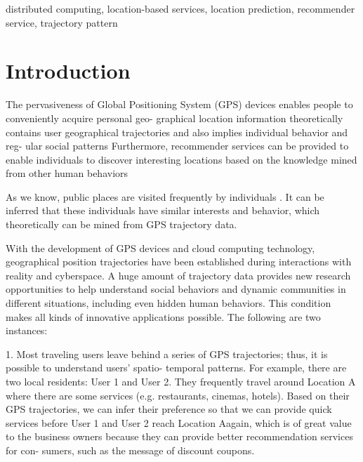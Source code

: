 \documentclass[conference]{IEEEtran}
\begin{document}
\renewcommand\IEEEkeywordsname{Keywords}
\begin{IEEEkeywords}
distributed computing, location-based services, location prediction, recommender service, trajectory pattern
\end{IEEEkeywords}




\IEEEpeerreviewmaketitle



\section{Introduction}


The pervasiveness of Global Positioning System (GPS) devices enables people to conveniently acquire personal geo- graphical location information 
theoretically contains user geographical trajectories and also implies individual behavior and reg- ular social patterns Furthermore, recommender services can be provided to enable individuals to discover interesting locations based on 
 the knowledge mined from other human behaviors \cite{zhou2007bipartite,de2015bipartite,hu2007co,tang2012user} 

  As we know, public places are visited frequently by individuals . It can be inferred that these individuals have similar interests and behavior, which
theoretically can be mined from GPS trajectory data.


  With the development of GPS devices and cloud computing technology, geographical position trajectories have been established during interactions with
reality and cyberspace. A huge amount of trajectory data provides new research opportunities to help understand social behaviors and dynamic communities
in different situations, including even hidden human behaviors. This condition makes all kinds of innovative applications possible. The following are two
instances: 

  1. Most traveling users leave behind a series of GPS trajectories; thus, it is possible to understand users’ spatio- temporal patterns. For example,
there are two local residents: User 1 and User 2. They frequently travel around Location A where there are some services (e.g. restaurants, cinemas,
hotels). Based on their GPS trajectories, we can infer their preference so that we can provide quick services before User 1 and User 2 reach Location 
Aagain, which is of great value to the business owners because they can provide better recommendation services for con- sumers, such as the message of
discount coupons. 
  
\end{document}
